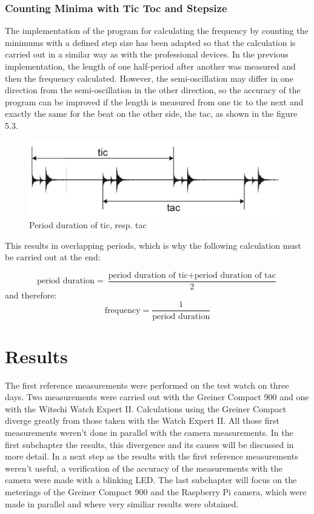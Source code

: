 \documentclass[12pt, a4paper]{report}
\begin{document}
    \subsection{Counting Minima with Tic Toc and Stepsize}
  The implementation of the program for calculating the frequency by counting the minimums with a defined step size has been adapted so that the calculation is carried out in a similar way as with the professional devices. In the previous implementation, the length of one half-period after another was measured and then the frequency calculated. However, the semi-oscillation may differ in one direction from the semi-oscillation in the other direction, so the accuracy of the program can be improved if the length is measured from one tic to the next and exactly the same for the beat on the other side, the tac, as shown in the figure 5.3. 
       \noindent
    \begin{figure}[H]
        \centering
        \includegraphics[scale=0.4]{Images/gangdeviation.png}
    
    \caption{Period duration of tic, resp. tac}
    \end{figure}    
  
  This results in overlapping periods, which is why the following calculation must be carried out at the end:
  
       \begin{displaymath}
     \text{period duration} = \frac{\text{period duration of tic} + \text{period duration of tac}}{2} 
     \end{displaymath}
  and therefore: 
       \begin{displaymath}
      \text{frequency}= \frac{1}{\text{period duration}}
     \end{displaymath}
     
    
    \chapter{Results}
        The first reference measurements were performed on the test watch on three days. Two measurements were carried out with the Greiner Compact 900 and one with the Witschi Watch Expert II. Calculations using the Greiner Compact diverge greatly from those taken with the Watch Expert II. All those first measurements weren't done in parallel with the camera measurements. In the first subchapter the results, this divergence and its causes will be discussed in more detail. In a next step as the results with the first reference measurements weren't useful, a verification of the accuracy of the measurements with the camera were made with a blinking LED. The last subchapter will focus on the meterings of the Greiner Compact 900 and the Raspberry Pi camera, which were made in parallel and where very similiar results were obtained. 
\end{document}
